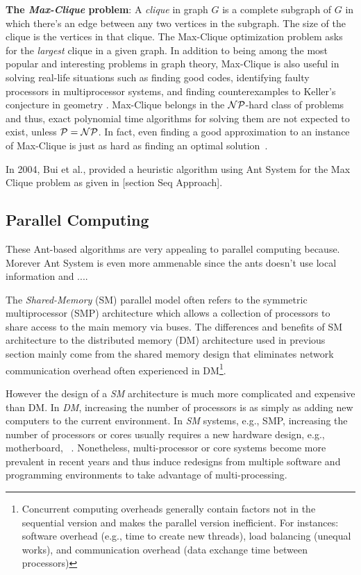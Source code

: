 \documentclass[11pt]{article}
\begin{document}
\textbf{The \textit{Max-Clique} problem}: A \textit{clique} in graph $G$ is a complete subgraph of $G$ in which there's an edge between any two vertices in the subgraph.  The size of the clique is the vertices in that clique. The Max-Clique optimization problem asks for the \textit{largest} clique in a given graph.  In addition to being among the most popular and interesting problems in graph theory, Max-Clique is also useful in  solving real-life situations such as finding good codes, identifying faulty processors in multiprocessor systems, and finding counterexamples to Keller's conjecture in geometry \cite{BP2}\cite{Sloane}\cite{SMW}\cite{Keller}\cite{LS}.  Max-Clique belongs in the $\cal NP$-hard class of problems and thus, exact polynomial time algorithms for solving them are not expected to exist, unless $\cal P = NP$.  In fact, even finding a good approximation to an instance of Max-Clique is just as hard as finding an optimal solution~\cite{Hastad}. %

In 2004, Bui et al., provided a heuristic algorithm using Ant System for the Max Clique problem as given 
in [section Seq Approach].


\subsection{Parallel Computing}
These Ant-based algorithms are very appealing to parallel computing because.  Morever Ant System is even more ammenable since the ants doesn't use local information and ....


The \textit{Shared-Memory} (SM) parallel model often refers to the symmetric multiprocessor (SMP) architecture which allows a collection of processors to share access to the main memory via buses. The differences and benefits of SM architecture to the distributed memory (DM) architecture used in previous section mainly come from the shared memory design that eliminates network communication overhead often experienced in DM\footnote{Concurrent computing overheads generally contain factors not in the sequential version and makes the parallel version inefficient. For instances: software overhead (e.g., time to create new threads), load balancing (unequal works), and communication overhead (data exchange time between processors)}. 

However the design of a \textit{SM} architecture is much more complicated and expensive than DM. In \textit{DM}, increasing the number of processors is as simply as adding new computers to the current environment. In \textit{SM} systems, e.g., SMP, increasing the number of processors or cores usually requires a new hardware design, e.g., motherboard, ~\cite{Hi}.  Nonetheless, multi-processor or core systems become more prevalent in recent years and thus induce redesigns from multiple software and programming environments to take advantage of multi-processing.
\end{document}
